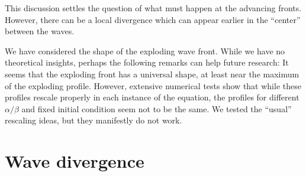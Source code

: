 \documentclass[12pt,a4paper]{article}
\numberwithin{equation}{section}
\theoremstyle{definition} %
\begin{document}
This discussion settles the question of what must happen at the
advancing fronts. However, there can be a local divergence which can
appear earlier in the ``center'' between the waves.

We have considered the shape of the exploding wave front. While we
have no theoretical insights, perhaps the following remarks can help
future research: It seems that the exploding front has a universal
shape, at least near the maximum of the exploding profile.
However, extensive numerical tests show that while these profiles rescale
properly in each instance of the equation, the profiles for
different $\alpha /\beta $ and fixed initial condition seem not to be the same. We tested the ``usual''
rescaling ideas, but they manifestly do not work.






\section{Wave divergence}
\end{document}
